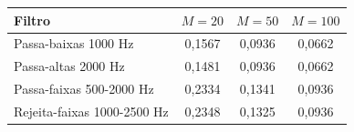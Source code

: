 \begin{tabular}{lccc}
\toprule
Filtro & $M=20$ & $M=50$ & $M=100$ \\
\midrule
Passa-baixas 1000 Hz & 0,1567 & 0,0936 & 0,0662 \\
Passa-altas 2000 Hz & 0,1481 & 0,0936 & 0,0662 \\
Passa-faixas 500-2000 Hz & 0,2334 & 0,1341 & 0,0936 \\
Rejeita-faixas 1000-2500 Hz & 0,2348 & 0,1325 & 0,0936 \\
\bottomrule
\end{tabular}